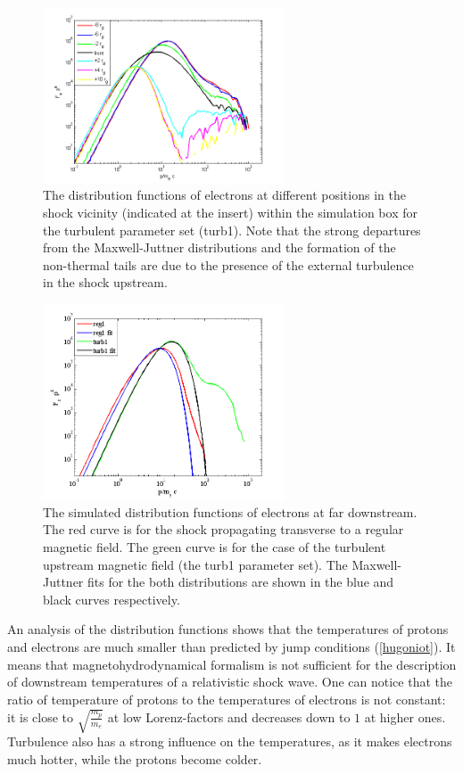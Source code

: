 \documentclass[a4paper]{jpconf}
\begin{document}
	\begin{figure}[h!]
		\centering
		\includegraphics[width=0.64\textwidth]{fig/electrons_at_points.png} 
		\caption{The distribution functions of electrons at different positions in the shock vicinity (indicated at the insert) within the simulation box for the  turbulent parameter set (turb1). Note that the strong departures from the Maxwell-Juttner distributions and the formation of the non-thermal tails are due to the presence of the external turbulence in the shock upstream.}
		\label{points}
	\end{figure}
	
	\begin{figure}[h!]
		\centering
		\includegraphics[width=0.64\textwidth]{fig/temperature_fit.png} 
		\caption{The simulated distribution functions of electrons at far downstream. The red curve is for the shock propagating transverse to a regular magnetic field. The green curve is for the case of the turbulent upstream magnetic field (the turb1 parameter set). The Maxwell-Juttner fits for the both distributions are shown in the blue and black curves respectively.}
		\label{temp_fit}
	\end{figure}
	
	An analysis of the distribution functions shows that the temperatures of protons and electrons are much smaller than predicted by jump conditions (\ref{hugoniot}). It means that magnetohydrodynamical formalism is not sufficient for the description of downstream temperatures of a relativistic shock wave. One can notice that the ratio of temperature of protons to the temperatures of electrons is not constant: it is close to $\sqrt{\frac{m_p}{m_e}}$ at low Lorenz-factors and decreases down to $1$ at higher ones. Turbulence also has a strong influence on the temperatures, as it makes electrons much hotter, while the protons become colder. 
	
\end{document}
